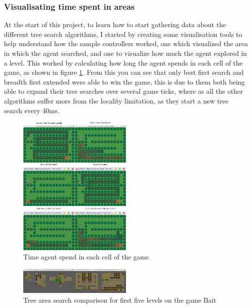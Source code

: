 \documentclass[journal]{IEEEtran}
\begin{document}
	\subsubsection{Visualisating time spent in areas}
	At the start of this project, to learn how to start gathering data about the different tree search algorithms, I started by creating some visualisation tools to help understand how the sample controllers worked, one which visualized the area in which the agent searched, and one to visualize how much the agent explored in a level. This worked by
 calculating how long the agent spends in each cell of the game, as shown in figure \ref{fig:treeSearchComparson}.
	From this you can see that only best first search and breadth first extended were able to win the game, this is due to them both being able to expand their tree searches over several game ticks, where as all the other algorithms suffer more from the locality limitation, as they start a new tree search every 40ms.
	\begin{figure}[h]
		   \centering
		   \includegraphics[width=0.5\textwidth]{treeSearchComparison}
		   \caption{ Time agent spend in each cell of the game }
		   \label{fig:treeSearchComparson}
	\end{figure}

	\begin{figure}[h]
		   \centering
		   \includegraphics[width=0.5\textwidth]{game_0_firstFive}
		   \caption{ Tree area search comparison for first five levels on the game Bait }
		   \label{fig:game_0_firstFive}
	\end{figure}
\end{document}
